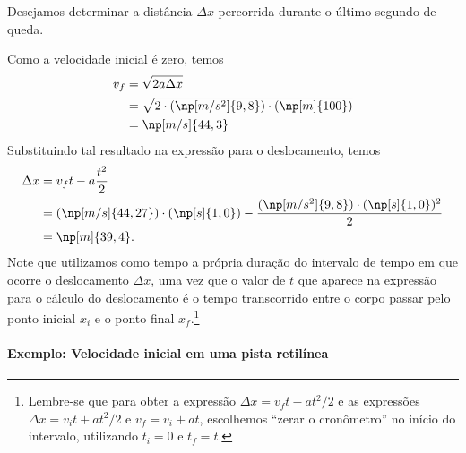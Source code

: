 \begin{marginfigure}
\centering
{}
\caption{Desejamos determinar a distância $\Delta x$ percorrida durante o último segundo de queda.\label{Fig:DeslUltimoSegQueda}}
\end{marginfigure}

Como a velocidade inicial é zero, temos
\begin{align}
    v_f &= \sqrt{2 a \Delta x} \\
    &= \sqrt{2 \cdot (\np[m/s^2]{9,8}) \cdot (\np[m]{100})} \\
    &= \np[m/s]{44,3}
\end{align}
%
Substituindo tal resultado na expressão para o deslocamento, temos
\begin{align}
    \Delta x &= v_f t - a\frac{t^2}{2} \\
    &= (\np[m/s]{44,27})\cdot(\np[s]{1,0}) - \frac{(\np[m/s^2]{9,8})\cdot(\np[s]{1,0})^2}{2} \\
    &= \np[m]{39,4}.
\end{align}
%
Note que utilizamos como tempo a própria duração do intervalo de tempo em que ocorre o deslocamento $\Delta x$, uma vez que o valor de $t$ que aparece na expressão para o cálculo do deslocamento é o tempo transcorrido entre o corpo passar pelo ponto inicial $x_i$ e o ponto final $x_f$.\footnote{Lembre-se que para obter a expressão $\Delta x = v_ft-at^2/2$ e as expressões $\Delta x = v_it+at^2/2$ e $v_f = v_i + a t$, escolhemos ``zerar o cronômetro'' no início do intervalo, utilizando $t_i = 0$ e $t_f = t$.}

\paragraph{Exemplo: Velocidade inicial em uma pista retilínea}

